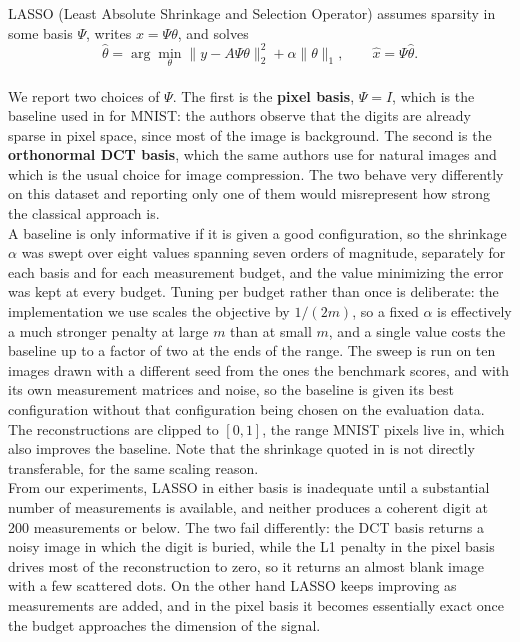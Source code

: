 LASSO (Least Absolute Shrinkage and Selection Operator) assumes sparsity in some basis \( \Psi \), writes \( x = \Psi\theta \), and solves
\begin{equation}
\hat{\theta} = \arg \min_\theta \|y - A\Psi\theta\|_2^2 + \alpha \|\theta\|_1, \qquad \hat{x} = \Psi\hat{\theta} .
\end{equation}
\\
We report two choices of \( \Psi \). The first is the \textbf{pixel basis}, \( \Psi = I \), which is the baseline used in \cite{bora2017} for MNIST: the authors observe that the digits are already sparse in pixel space, since most of the image is background. The second is the \textbf{orthonormal DCT basis}, which the same authors use for natural images and which is the usual choice for image compression. The two behave very differently on this dataset and reporting only one of them would misrepresent how strong the classical approach is.
\\
A baseline is only informative if it is given a good configuration, so the shrinkage \( \alpha \) was swept over eight values spanning seven orders of magnitude, separately for each basis and for each measurement budget, and the value minimizing the error was kept at every budget. Tuning per budget rather than once is deliberate: the implementation we use scales the objective by \( 1/(2m) \), so a fixed \( \alpha \) is effectively a much stronger penalty at large \( m \) than at small \( m \), and a single value costs the baseline up to a factor of two at the ends of the range. The sweep is run on ten images drawn with a different seed from the ones the benchmark scores, and with its own measurement matrices and noise, so the baseline is given its best configuration without that configuration being chosen on the evaluation data. The reconstructions are clipped to \( [0,1] \), the range MNIST pixels live in, which also improves the baseline. Note that the shrinkage quoted in \cite{bora2017} is not directly transferable, for the same scaling reason.
\\
From our experiments, LASSO in either basis is inadequate until a substantial number of measurements is available, and neither produces a coherent digit at 200 measurements or below. The two fail differently: the DCT basis returns a noisy image in which the digit is buried, while the L1 penalty in the pixel basis drives most of the reconstruction to zero, so it returns an almost blank image with a few scattered dots. On the other hand LASSO keeps improving as measurements are added, and in the pixel basis it becomes essentially exact once the budget approaches the dimension of the signal.


